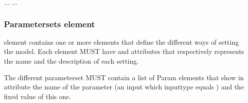 \documentclass[letterpaper,10pt,english]{sphinxmanual}
\begin{document}
%
\begin{sphinxVerbatim}[commandchars=\\\{\}]
    
   ...
    \PYG{c+cp}{\PYGZlt{}![CDATA[}
\PYG{c+cp}{      ]]\PYGZgt{}}
   ...
\end{sphinxVerbatim}


\subsubsection{Parametersets element}
\label{\detokenize{user/description:parametersets-element}}
\begin{DUlineblock}{0em}
\item[]  element contains one or more  elements that define the different ways of setting the model.
Each  element MUST have  and  attributes that respectively represents the name and the description of each setting.
\end{DUlineblock}

\begin{DUlineblock}{0em}
\item[] The different parameterset MUST contain a list of Param elements that show in attribute the name of the parameter (an input
which inputtype equals ) and the fixed value of this one.
\end{DUlineblock}
\end{document}

